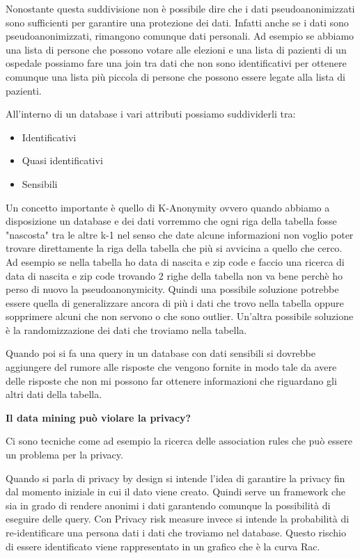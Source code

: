 \documentclass[14pt]{extreport}
\begin{document}
Nonostante questa suddivisione non è possibile dire che i dati pseudoanonimizzati sono sufficienti per garantire una protezione dei dati. Infatti anche se i dati sono pseudoanonimizzati, rimangono comunque dati personali.
Ad esempio se abbiamo una lista di persone che possono votare alle elezioni e una lista di pazienti di un ospedale possiamo fare una join tra dati che non sono identificativi per ottenere comunque una lista più piccola di persone che possono essere legate alla lista di pazienti.

All'interno di un database i vari attributi possiamo suddividerli tra:
\begin{itemize}
\item Identificativi
\item Quasi identificativi
\item Sensibili 
\end{itemize}

Un concetto importante è quello di K-Anonymity ovvero quando abbiamo a disposizione un database e dei dati vorremmo che ogni riga della tabella fosse "nascosta" tra le altre k-1 nel senso che date alcune informazioni non voglio poter trovare direttamente la riga della tabella che più si avvicina a quello che cerco. Ad esempio se nella tabella ho data di nascita e zip code e faccio una ricerca di data di nascita e zip code trovando 2 righe della tabella non va bene perchè ho perso di nuovo la pseudoanonymicity.
Quindi una possibile soluzione potrebbe essere quella di generalizzare ancora di più i dati che trovo nella tabella oppure sopprimere alcuni che non servono o che sono outlier.
Un'altra possibile soluzione è la randomizzazione dei dati che troviamo nella tabella.

Quando poi si fa una query in un database con dati sensibili si dovrebbe aggiungere del rumore alle risposte che vengono fornite in modo tale da avere delle risposte che non mi possono far ottenere informazioni che riguardano gli altri dati della tabella.

\textbf{Il data mining può violare la privacy?}

Ci sono tecniche come ad esempio la ricerca delle association rules che può essere un problema per la privacy.

Quando si parla di privacy by design si intende l'idea di garantire la privacy fin dal momento iniziale in cui il dato viene creato.
Quindi serve un framework che sia in grado di rendere anonimi i dati garantendo comunque la possibilità di eseguire delle query.
Con Privacy risk measure invece si intende la probabilità di re-identificare una persona dati i dati che troviamo nel database.
Questo rischio di essere identificato viene rappresentato in un grafico che è la curva Rac.
\end{document}
